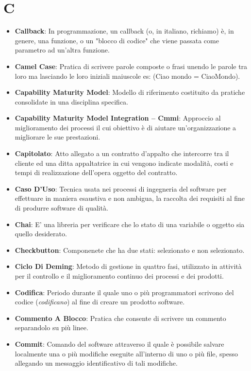 \section{C}
\begin{itemize}
	\item
	\textbf{Callback}: In programmazione, un callback (o, in italiano, richiamo) è, in genere, una funzione, o un "blocco di codice" che viene passata come parametro ad un'altra funzione.
	\item
	\textbf{Camel Case}: Pratica di scrivere parole composte o frasi unendo le parole tra loro ma lasciando le loro iniziali maiuscole es: (Ciao mondo = CiaoMondo).
	\item
	\textbf{Capability Maturity Model}: Modello di riferimento costituito da pratiche consolidate in una disciplina specifica.
	\item
	\textbf{Capability Maturity Model Integration -- Cmmi}: Approccio al miglioramento dei processi il cui obiettivo è di aiutare un'organizzazione a migliorare le sue prestazioni.
	\item
	\textbf{Capitolato}: Atto allegato a un contratto d'appalto che intercorre tra il cliente ed una ditta appaltatrice in cui vengono indicate modalità, costi e tempi di realizzazione dell'opera oggetto del contratto.
	\item
	\textbf{Caso D'Uso}: Tecnica usata nei processi di ingegneria del software per effettuare in maniera esaustiva e non ambigua, la raccolta dei requisiti al fine di produrre software di qualità.
	\item
	\textbf{Chai}: E' una libreria per verificare che lo stato di una variabile o oggetto sia quello desiderato.
	\item
	\textbf{Checkbutton}: Componenete che ha due stati: selezionato e non selezionato.
	\item
	\textbf{Ciclo Di Deming}: Metodo di gestione in quattro fasi, utilizzato in attività per il controllo e il miglioramento continuo dei processi e dei prodotti.
	\item
	\textbf{Codifica}: Periodo durante il quale uno o più programmatori scrivono del codice (\textit{codificano}) al fine di creare un prodotto software.
	\item
	\textbf{Commento A Blocco}: Pratica che consente di scrivere un commento separandolo su più linee.
	\item
	\textbf{Commit}: Comando del software  attraverso il quale è possibile salvare localmente una o più modifiche eseguite all'interno di uno o più file, spesso allegando un messaggio identificativo di tali modifiche.

\end{itemize}
